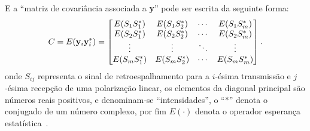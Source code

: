 \documentclass[a4paper,12pt]{article}
\begin{document}
%
%

E a ``matriz de covariância associada a {\bf y}'' pode ser escrita da seguinte forma:
\begin{equation*}%
C=E({\bf y}_{i}{\bf y}_{i}^{*})=\begin{bmatrix}
	E(S_{1}S_{1}^{*})	&	E(S_{1}S_{2}^{*})	&	\cdots	&	E(S_{1}S_{m}^{*})\\
	E(S_{2}S_{1}^{*})	&	E(S_{2}S_{2}^{*})	&	\cdots	&	E(S_{2}S_{m}^{*})\\
		\vdots			&			\vdots		&	\ddots	&		\vdots		\\
	E(S_{m}S_{1}^{*})	&	E(S_{m}S_{2}^{*})	&	\cdots	&	E(S_{m}S_{m}^{*})\\		
\end{bmatrix}.
\end{equation*}
onde $S_{ij}$ representa o sinal de retroespalhamento para a $i$-ésima transmissão e $j$-ésima recepção de uma polarização linear, os elementos da diagonal principal são números reais positivos, e {denominam-se} ``intensidades''\label{intensidades}, o ``$*$'' denota o conjugado de um número complexo, por fim $E(\cdot)$ denota o operador esperança estatística~\citep{Lee-2009,Nascimento-2014}.
\end{document}
